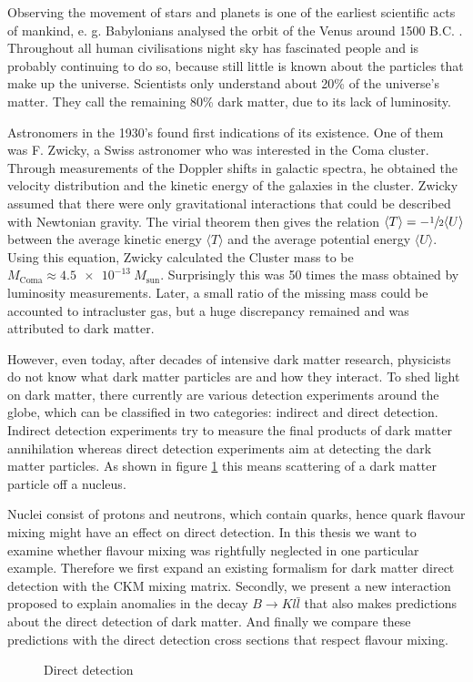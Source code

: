 Observing the movement of stars and planets is one of the earliest scientific acts of mankind, e. g. Babylonians analysed the orbit of the Venus around 1500 B.C. \cite{History}. Throughout all human civilisations night sky has fascinated people and is probably continuing to do so, because still little is known about the particles that make up the universe. Scientists only understand about 20\% of the universe's matter. They call the remaining 80\% dark matter, due to its lack of luminosity. \cite{DM}


Astronomers in the 1930's found first indications of its existence. One of them was F. Zwicky, a Swiss astronomer who was interested in the Coma cluster. Through measurements of the Doppler shifts in galactic spectra, he obtained the velocity distribution and the kinetic energy of the galaxies in the cluster. Zwicky assumed that there were only gravitational interactions that could be described with Newtonian gravity. The virial theorem then gives the relation $\langle T\rangle = -\sfrac{1}{2}\langle U\rangle$ between the average kinetic energy $\langle T\rangle$ and the average potential energy $\langle U\rangle$. Using this equation, Zwicky calculated the Cluster mass to be $M_\text{Coma} \approx \SI{4.5e-13}{}M_\text{sun}$. Surprisingly this was 50 times the mass obtained by luminosity measurements. Later, a small ratio of the missing mass could be accounted to intracluster gas, but a huge discrepancy remained and was attributed to dark matter. \cite{DM}


However, even today, after decades of intensive dark matter research, physicists do not know what dark matter particles are and how they interact. To shed light on dark matter, there currently are various detection experiments around the globe, which can be classified in two categories: indirect and direct detection. Indirect detection experiments try to measure the final products of dark matter annihilation whereas direct detection experiments aim at detecting the dark matter particles. As shown in figure \ref{fig:DirectDetection} this means scattering of a dark matter particle off a nucleus.


Nuclei consist of protons and neutrons, which contain quarks, hence quark flavour mixing might have an effect on direct detection. In this thesis we want to examine whether flavour mixing was rightfully neglected in one particular example. Therefore we first expand an existing formalism for dark matter direct detection with the CKM mixing matrix. Secondly, we present a new interaction proposed to explain anomalies in the decay $B\rightarrow Kl\bar{l}$ that also makes predictions about the direct detection of dark matter. And finally we compare these predictions with the direct detection cross sections that respect flavour mixing.


\begin{figure}
	\centering
	
	\caption{Direct detection}
	\label{fig:DirectDetection}
\end{figure}